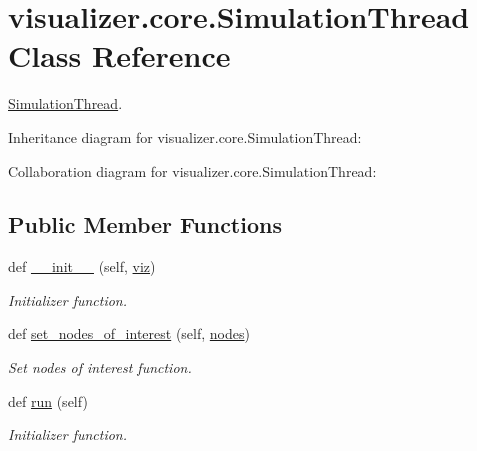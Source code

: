 \hypertarget{classvisualizer_1_1core_1_1SimulationThread}{}\section{visualizer.\+core.\+Simulation\+Thread Class Reference}
\label{classvisualizer_1_1core_1_1SimulationThread}


\hyperlink{classvisualizer_1_1core_1_1SimulationThread}{Simulation\+Thread}.  




Inheritance diagram for visualizer.\+core.\+Simulation\+Thread\+:


Collaboration diagram for visualizer.\+core.\+Simulation\+Thread\+:
\subsection*{Public Member Functions}
\begin{DoxyCompactItemize}
\item 
def \hyperlink{classvisualizer_1_1core_1_1SimulationThread_a6c0f3acc15ef0a2017941ba4fa799f91}{\+\_\+\+\_\+init\+\_\+\+\_\+} (self, \hyperlink{classvisualizer_1_1core_1_1SimulationThread_ab3615e7268de3c70ec0d11c6b595d7ec}{viz})
\begin{DoxyCompactList}\small\item\em Initializer function. \end{DoxyCompactList}\item 
def \hyperlink{classvisualizer_1_1core_1_1SimulationThread_a5781baa597f91c5b2c98413d3409fe93}{set\+\_\+nodes\+\_\+of\+\_\+interest} (self, \hyperlink{visualizer-ideas_8txt_a3e1b3808014a2c68ab0cd0182e041be2}{nodes})
\begin{DoxyCompactList}\small\item\em Set nodes of interest function. \end{DoxyCompactList}\item 
def \hyperlink{classvisualizer_1_1core_1_1SimulationThread_a2fb28e4223f617bfe0587953a0792f63}{run} (self)
\begin{DoxyCompactList}\small\item\em Initializer function. \end{DoxyCompactList}\end{DoxyCompactItemize}
